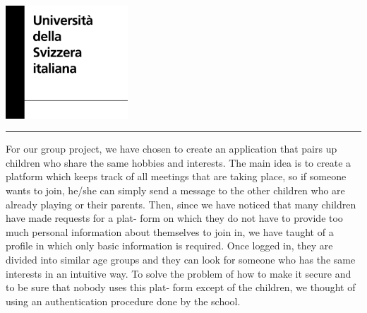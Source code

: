 \documentclass[12pt]{article}
\begin{document}
\setlength{\voffset}{-1in}
\setlength{\oddsidemargin}{-60pt}
\begin{titlepage}
\vspace*{2pt}
\parbox[b]{0.75\textwidth[124pt]}{\includegraphics[width=130pt]{University-of-Lugano.png}}
\hspace*{10pt}
\rule{1pt}{\textheight}
\end{titlepage}







\newpage
\setlength{\voffset}{0pt}
\setlength{\oddsidemargin}{17pt}
\pagestyle{fancy}
\fancyhf{}


For our group project, we have chosen to create an application that pairs up children who share the same
hobbies and interests. The main idea is to create a platform which keeps track of all meetings that are
taking place, so if someone wants to join, he/she can simply send a message to the other children who are
already playing or their parents. Then, since we have noticed that many children have made requests for a
plat- form on which they do not have to provide too much personal information about themselves to join in,
we have taught of a profile in which only basic information is required. Once logged in, they are divided
into similar age groups and they can look for someone who has the same interests in an intuitive way. To
solve the problem of how to make it secure and to be sure that nobody uses this plat- form except of the
children, we thought of using an authentication procedure done by the school. \\
\end{document}
